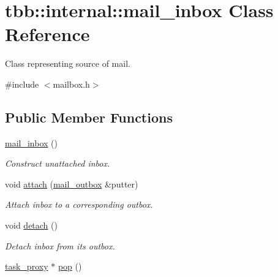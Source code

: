 \hypertarget{classtbb_1_1internal_1_1mail__inbox}{}\section{tbb\+:\+:internal\+:\+:mail\+\_\+inbox Class Reference}
\label{classtbb_1_1internal_1_1mail__inbox}


Class representing source of mail.  




{\ttfamily \#include $<$mailbox.\+h$>$}

\subsection*{Public Member Functions}
\begin{DoxyCompactItemize}
\item 
\hypertarget{classtbb_1_1internal_1_1mail__inbox_a1bdd2891d8103e38dfc063e6977cfc7a}{}\hyperlink{classtbb_1_1internal_1_1mail__inbox_a1bdd2891d8103e38dfc063e6977cfc7a}{mail\+\_\+inbox} ()\label{classtbb_1_1internal_1_1mail__inbox_a1bdd2891d8103e38dfc063e6977cfc7a}

\begin{DoxyCompactList}\small\item\em Construct unattached inbox. \end{DoxyCompactList}\item 
\hypertarget{classtbb_1_1internal_1_1mail__inbox_a5db22ebed6cee417875881d6ee260231}{}void \hyperlink{classtbb_1_1internal_1_1mail__inbox_a5db22ebed6cee417875881d6ee260231}{attach} (\hyperlink{classtbb_1_1internal_1_1mail__outbox}{mail\+\_\+outbox} \&putter)\label{classtbb_1_1internal_1_1mail__inbox_a5db22ebed6cee417875881d6ee260231}

\begin{DoxyCompactList}\small\item\em Attach inbox to a corresponding outbox. \end{DoxyCompactList}\item 
\hypertarget{classtbb_1_1internal_1_1mail__inbox_ab4d587f455177aec5b07e4f1ee00440a}{}void \hyperlink{classtbb_1_1internal_1_1mail__inbox_ab4d587f455177aec5b07e4f1ee00440a}{detach} ()\label{classtbb_1_1internal_1_1mail__inbox_ab4d587f455177aec5b07e4f1ee00440a}

\begin{DoxyCompactList}\small\item\em Detach inbox from its outbox. \end{DoxyCompactList}\item 
\hypertarget{classtbb_1_1internal_1_1mail__inbox_a3f773a346ca9e41cad1085b246181f42}{}\hyperlink{structtbb_1_1internal_1_1task__proxy}{task\+\_\+proxy} $\ast$ \hyperlink{classtbb_1_1internal_1_1mail__inbox_a3f773a346ca9e41cad1085b246181f42}{pop} ()\label{classtbb_1_1internal_1_1mail__inbox_a3f773a346ca9e41cad1085b246181f42}


\end{DoxyCompactItemize}
